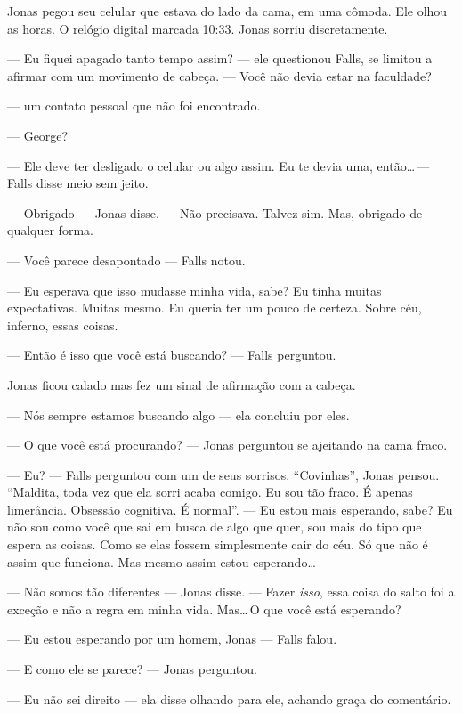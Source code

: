 Jonas pegou seu celular\mudanca{,} que estava do lado da cama, em uma cômoda. Ele olhou as horas. O relógio digital marcada 10:33. Jonas sorriu discretamente.

--- Eu fiquei apagado tanto tempo assim? --- ele questionou Falls, se limitou a afirmar com um movimento de cabeça. --- Você não devia estar na faculdade?

---  um contato pessoal que não foi encontrado.

--- George?

--- Ele deve ter desligado o celular ou algo assim. Eu te devia uma, então\ldots\,--- Falls disse\mudanca{,} meio sem jeito.

--- Obrigado --- Jonas disse. --- Não precisava. Talvez sim. Mas, obrigado de qualquer forma.

--- Você parece desapontado --- Falls notou.

--- Eu esperava que isso mudasse minha vida, sabe? Eu tinha muitas expectativas. Muitas mesmo. Eu queria ter um pouco de certeza. Sobre céu, inferno, essas coisas.

--- Então é isso que você está buscando? --- Falls perguntou.

Jonas ficou calado\mudanca{,} mas fez um sinal de afirmação com a cabeça.

--- Nós sempre estamos buscando algo --- ela concluiu por eles.

--- O que você está procurando? --- Jonas perguntou se ajeitando na cama fraco.

--- Eu? --- Falls perguntou com um de seus sorrisos. ``Covinhas'', Jonas pensou. ``Maldita, toda vez que ela sorri acaba comigo. Eu sou tão fraco. É apenas limerância. Obsessão cognitiva. É normal''. --- Eu estou mais esperando, sabe? Eu não sou como você que sai em busca de algo que quer, sou mais do tipo que espera as coisas. Como se elas fossem simplesmente cair do céu. Só que não é assim que funciona. Mas mesmo assim estou esperando\ldots

--- Não somos tão diferentes --- Jonas disse. --- Fazer \emph{isso}, essa coisa do salto foi a exceção e não a regra em minha vida. Mas\ldots\,O que você está esperando?

--- Eu estou esperando por um homem, Jonas --- Falls falou.

--- E como ele se parece? --- Jonas perguntou.

--- Eu não sei direito --- ela disse olhando para ele, achando graça do comentário.

